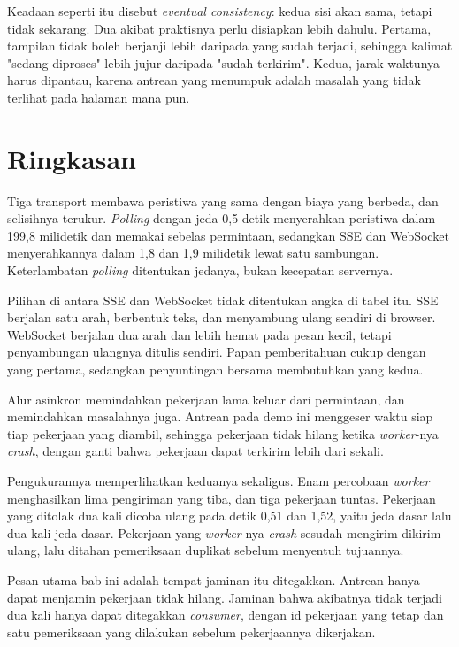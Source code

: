 Keadaan seperti itu disebut \textit{eventual consistency}: kedua sisi akan
sama, tetapi tidak sekarang. Dua akibat praktisnya perlu disiapkan lebih
dahulu. Pertama, tampilan tidak boleh berjanji lebih daripada yang sudah
terjadi, sehingga kalimat "sedang diproses" lebih jujur daripada "sudah
terkirim". Kedua, jarak waktunya harus dipantau, karena antrean yang
menumpuk adalah masalah yang tidak terlihat pada halaman mana pun.

\section{Ringkasan}

Tiga transport membawa peristiwa yang sama dengan biaya yang berbeda, dan
selisihnya terukur. \textit{Polling} dengan jeda 0,5 detik menyerahkan
peristiwa dalam 199,8 milidetik dan memakai sebelas permintaan, sedangkan SSE
dan WebSocket menyerahkannya dalam 1,8 dan 1,9 milidetik lewat satu
sambungan. Keterlambatan \textit{polling} ditentukan jedanya, bukan kecepatan
servernya.

Pilihan di antara SSE dan WebSocket tidak ditentukan angka di tabel itu. SSE
berjalan satu arah, berbentuk teks, dan menyambung ulang sendiri di browser.
WebSocket berjalan dua arah dan lebih hemat pada pesan kecil, tetapi
penyambungan ulangnya ditulis sendiri. Papan pemberitahuan cukup dengan yang
pertama, sedangkan penyuntingan bersama membutuhkan yang kedua.

Alur asinkron memindahkan pekerjaan lama keluar dari permintaan, dan
memindahkan masalahnya juga. Antrean pada demo ini menggeser waktu siap tiap
pekerjaan yang diambil, sehingga pekerjaan tidak hilang ketika
\textit{worker}-nya \textit{crash}, dengan ganti bahwa pekerjaan dapat terkirim lebih
dari sekali.

Pengukurannya memperlihatkan keduanya sekaligus. Enam percobaan
\textit{worker} menghasilkan lima pengiriman yang tiba, dan tiga pekerjaan
tuntas. Pekerjaan yang ditolak dua kali dicoba ulang pada detik 0,51 dan
1,52, yaitu jeda dasar lalu dua kali jeda dasar. Pekerjaan yang
\textit{worker}-nya \textit{crash} sesudah mengirim dikirim ulang, lalu ditahan
pemeriksaan duplikat sebelum menyentuh tujuannya.

Pesan utama bab ini adalah tempat jaminan itu ditegakkan. Antrean hanya dapat
menjamin pekerjaan tidak hilang. Jaminan bahwa akibatnya tidak terjadi dua
kali hanya dapat ditegakkan \textit{consumer}, dengan id pekerjaan yang tetap
dan satu pemeriksaan yang dilakukan sebelum pekerjaannya dikerjakan.
